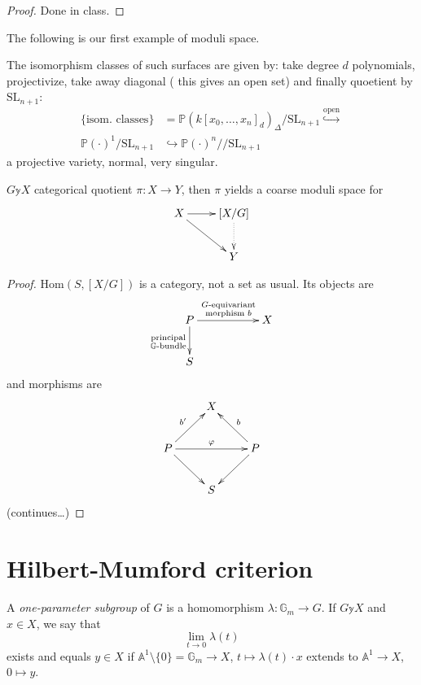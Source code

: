 \begin{proof}
Done in class.
\end{proof}

The following is our first example of moduli
space.

\begin{example}
\label{example-smooth-hypersurfaces}
The isomorphism classes of such surfaces are
given by: take degree $d$ polynomials,
projectivize, take away diagonal ( this gives
an open set) and finally quoetient by
$\text{SL}_{n+1}$:
$$
\begin{aligned}
\{\text{isom.
classes}\}&=\mathbb{P}(k[x_0,\ldots,x_n]_d)
_{\Delta}
/\text{SL}_{n+1}\overset{\text{open}}
{\hookrightarrow
}\\
\mathbb{P}(\cdot)^1/\text{SL}_{n+1}&
\hookrightarrow
\mathbb{P}(\cdot)^n/\!/\text{SL}_{n+1}
\end{aligned}
$$
a projective variety, normal, very singular.
\end{example}

\begin{remark}
\label{git-label-012}
$G \mathbb{y} X$ categorical quotient $\pi:X
\to Y$, then $\pi$ yields a coarse moduli
space for
$$
\xymatrix{
X\ar[r]\ar[rd]& [X/G]\ar@{.>}[d]\\
&Y
}
$$
\end{remark}

\begin{proof}
$\text{Hom}(S,[X/G])$ is a category, not a
set as usual. Its objects are
$$
\xymatrix{
P\ar[d]_{\substack{\text{principal} \\
\mathbb{G}\text{-bundle}}}
\ar[rr]^{\substack{G\text{-equivariant} \\
\text{morphism }b}}&&X\\
S
}
$$
and morphisms are
$$
\xymatrix{
&X\\
P\ar[ur]^{b'}\ar[rr]^\varphi \ar[dr]&  &
P\ar[ul]_b\ar[dl]\\
&S
}
$$
(continues\ldots{})
\end{proof}

\section{Hilbert-Mumford criterion}
\label{section-Hilbert-Mumford-criterion}

\begin{definition}
\label{definition-one-parameter-subgroup}
A {\it one-parameter subgroup} of  $G$ is a
homomorphism $\lambda:\mathbb{G}_m \to G$. If
$G \mathbb{y} X$ and $x \in X$, we say that
$$
\lim_{t \to 0}\lambda(t)
$$
exists and equals $y \in X$ if
$\mathbb{A}^1\setminus\{0\}=\mathbb{G}_m \to
X$, $t \mapsto \lambda(t)\cdot x$ extends to
$\mathbb{A}^1 \to X$, $0 \mapsto y$.
\end{definition}

